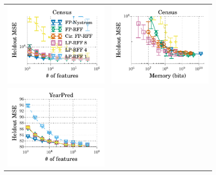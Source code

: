 \begin{figure}
	\centering
	\begin{tabular}{c c}
		\includegraphics[width=0.4\linewidth]{figures/census_MSE_vs_n_feat_all_line.pdf} &
		\includegraphics[width=0.4\linewidth]{figures/census_MSE_vs_n_memory_all_line.pdf} \\
		\includegraphics[width=0.4\linewidth]{figures/yearpred_MSE_vs_n_feat_all_line.pdf} &

\end{tabular}
\end{figure}
